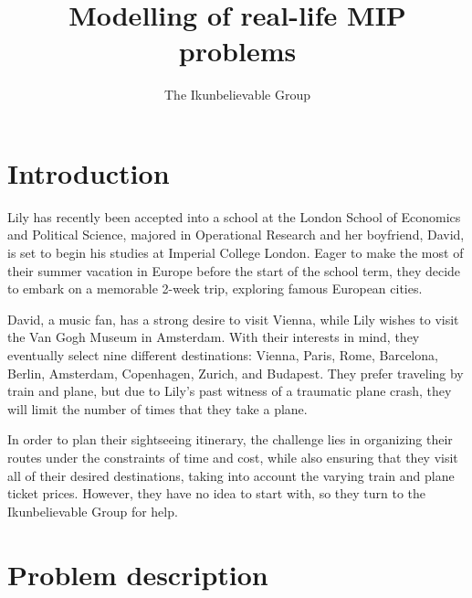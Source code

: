 \documentclass{extarticle}
\title{Modelling of real-life MIP problems}
\author{The Ikunbelievable Group\footnotemark[1]}
\date{}
\begin{document}
\maketitle

\renewcommand{\thefootnote}{\fnsymbol{footnote}}
\renewcommand{\thefootnote}{\arabic{footnote}}

\section{Introduction}

Lily has recently been accepted into a school at the London School of Economics
and Political Science, majored in Operational Research and her boyfriend,
David, is set to begin his studies at Imperial College London. Eager to make
the most of their summer vacation in Europe before the start of the school
term, they decide to embark on a memorable 2-week trip, exploring famous
European cities.

David, a music fan, has a strong desire to visit Vienna, while Lily wishes to
visit the Van Gogh Museum in Amsterdam. With their interests in mind, they
eventually select nine different destinations: Vienna, Paris, Rome, Barcelona,
Berlin, Amsterdam, Copenhagen, Zurich, and Budapest. They prefer traveling by
train and plane, but due to Lily's past witness of a traumatic plane crash,
they will limit the number of times that they take a plane.

In order to plan their sightseeing itinerary, the challenge lies in organizing
their routes under the constraints of time and cost, while also ensuring that
they visit all of their desired destinations, taking into account the varying
train and plane ticket prices. However, they have no idea to start with, so
they turn to the Ikunbelievable Group for help.

\section{Problem description}
\end{document}
